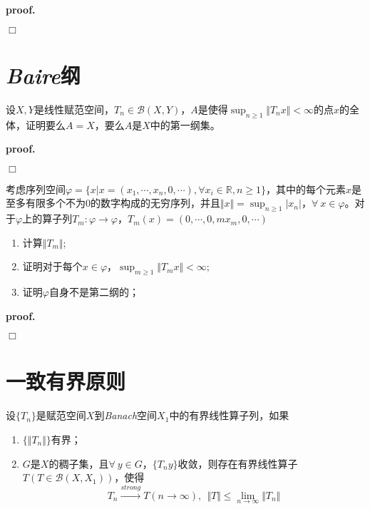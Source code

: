 \textbf{proof.}

$\Box$

\section{\textsl{Baire}纲}

\begin{mdframed}
    \begin{question}
        设$X,Y$是线性赋范空间，$T_n\in \mathcal{B}(X,Y)$，$A$是使得$\sup_{n\geqslant 1}\Vert T_nx\Vert<\infty$的点$x$的全体，证明要么$A=X$，要么$A$是$X$中的第一纲集。
    \end{question}
\end{mdframed}

\textbf{proof.}

$\Box$

\begin{mdframed}
    \begin{question}
        考虑序列空间$\varphi=\{x|x=(x_1,\cdots,x_n,0,\cdots),\forall x_i\in \mathbb{R},n\geqslant 1\}$，其中的每个元素$x$是至多有限多个不为$0$的数字构成的无穷序列，并且$\Vert x\Vert=\sup_{n\geqslant 1}|x_n|$，$\forall\ x\in \varphi$。对于$\varphi$上的算子列$T_m:\varphi\rightarrow \varphi$，$T_m(x)=(0,\cdots,0,mx_m,0,\cdots)$
        \begin{enumerate}[itemindent=2em]
            \item 计算$\Vert T_m\Vert$;
            \item 证明对于每个$x\in \varphi$，$\sup_{m\geqslant 1}\Vert T_mx\Vert<\infty$;
            \item 证明$\varphi$自身不是第二纲的；
        \end{enumerate}
    \end{question}
\end{mdframed}

\textbf{proof.}

$\Box$

\section{一致有界原则}

\begin{mdframed}
    \begin{question}
        设$\{T_n\}$是赋范空间$X$到\textsl{Banach}空间$X_1$中的有界线性算子列，如果
        \begin{enumerate}[itemindent=2em]
            \item $\{\Vert T_n\Vert\}$有界；
            \item $G$是$X$的稠子集，且$\forall\ y\in G$，$\{T_ny\}$收敛，则存在有界线性算子$T(T\in \mathcal{B}(X,X_1))$，使得
            \begin{equation}
                T_n\xrightarrow{strong} T(n\rightarrow \infty),\ \ \Vert T\Vert\leqslant \lim_{n\rightarrow\infty} \Vert T_n\Vert
            \end{equation}
        \end{enumerate}
    \end{question}
\end{mdframed}


